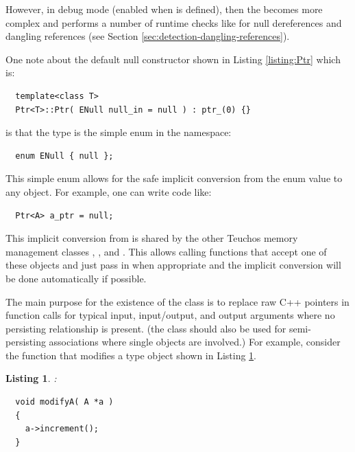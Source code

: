 \documentclass[pdf,ps2pdf,11pt]{SANDreport}
\newtheorem{listing}{Listing}
\begin{document}
However, in debug mode (enabled when {} is
defined), then the {} becomes more complex and performs a
number of runtime checks like for null dereferences and dangling
references (see Section {}\ref{sec:detection-dangling-references}).

One note about the default null constructor shown in Listing
{}\ref{listing:Ptr} which is:

{\small\begin{verbatim}
  template<class T>
  Ptr<T>::Ptr( ENull null_in = null ) : ptr_(0) {}
\end{verbatim}}

{}\noindent{}is that the type {} is the simple enum in
the {} namespace:

{\small\begin{verbatim}
  enum ENull { null };
\end{verbatim}}

This simple enum allows for the safe implicit conversion from the enum
value {} to any {} object.  For example, one can
write code like:

{\small\begin{verbatim}
  Ptr<A> a_ptr = null;
\end{verbatim}}

This implicit conversion from {} is shared by the other
Teuchos memory management classes {},
{}, and {}.  This allows calling
functions that accept one of these objects and just pass in
{} when appropriate and the implicit conversion will be done
automatically if possible.

The main purpose for the existence of the {} class is to
replace raw C++ pointers in function calls for typical input,
input/output, and output arguments where no persisting relationship is
present.  (the class {} should also be used for
semi-persisting associations where single objects are involved.)  For
example, consider the function that modifies a type {}
object shown in Listing {}\ref{listing:modifyA-rawPtr}.

\begin{listing}:\\
\label{listing:modifyA-rawPtr}
{\small\begin{verbatim}
  void modifyA( A *a )
  {
    a->increment();
  }
\end{verbatim}}
\end{listing}
\end{document}
